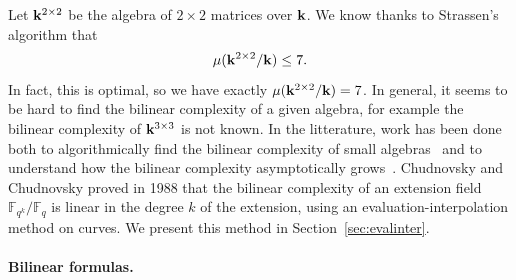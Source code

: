 Let $\mathbf{k}^{2\times2}$ be the algebra
of $2\times2$ matrices over $\mathbf{k}$. We know thanks to Strassen's algorithm that
\[
  \mu(\mathbf{k}^{2\times 2}/\mathbf{k}) \leq 7.
\]
In fact, this is optimal, so we have exactly $\mu(\mathbf{k}^{2\times2}/\mathbf{k})=7$. In
general, it seems to be hard to find the bilinear complexity of a given algebra,
for example the bilinear complexity of $\mathbf{k}^{3\times3}$ is not known.
In the litterature, work has been done both to algorithmically find the bilinear complexity of
small algebras~\cite{BDEZ12, Covanov19} and to understand how the bilinear
complexity asymptotically grows~\cite{CC88, BCPRRR19}. Chudnovsky and Chudnovsky
proved in 1988 that the bilinear complexity of an extension field
$\mathbb{F}_{q^k}/\mathbb{F}_{q}$ is linear in the degree $k$ of the
extension, using an evaluation-interpolation method on curves. We present this
method in Section~\ref{sec:evalinter}.

\paragraph{Bilinear formulas.}


